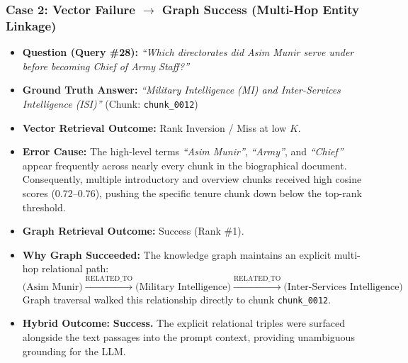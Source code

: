 \documentclass[11pt,a4paper]{article}
\begin{document}
\subsubsection{Case 2: Vector Failure $\to$ Graph Success (Multi-Hop Entity Linkage)}
\begin{itemize}[nosep]
  \item \textbf{Question (Query \#28):} \textit{``Which directorates did Asim Munir serve under before becoming Chief of Army Staff?''}
  \item \textbf{Ground Truth Answer:} \textit{``Military Intelligence (MI) and Inter-Services Intelligence (ISI)''} (Chunk: \texttt{chunk\_0012})
  \item \textbf{Vector Retrieval Outcome:} Rank Inversion / Miss at low $K$.
  \item \textbf{Error Cause:} The high-level terms \textit{``Asim Munir''}, \textit{``Army''}, and \textit{``Chief''} appear frequently across nearly every chunk in the biographical document. Consequently, multiple introductory and overview chunks received high cosine scores (0.72--0.76), pushing the specific tenure chunk down below the top-rank threshold.
  \item \textbf{Graph Retrieval Outcome:} Success (Rank \#1).
  \item \textbf{Why Graph Succeeded:} The knowledge graph maintains an explicit multi-hop relational path:
  \[
  \text{(Asim Munir)} \xrightarrow{\text{RELATED\_TO}} \text{(Military Intelligence)} \xrightarrow{\text{RELATED\_TO}} \text{(Inter-Services Intelligence)}
  \]
  Graph traversal walked this relationship directly to chunk \texttt{chunk\_0012}.
  \item \textbf{Hybrid Outcome:} \textbf{Success.} The explicit relational triples were surfaced alongside the text passages into the prompt context, providing unambiguous grounding for the LLM.
\end{itemize}
\end{document}

